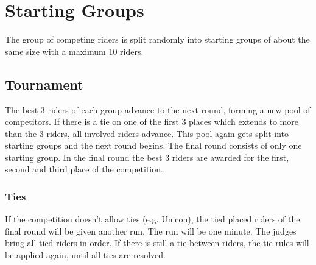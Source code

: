 \section{Starting Groups}
The group of competing riders is split randomly into starting groups of about the same size with a maximum 10 riders.

\subsection{Tournament}
The best 3 riders of each group advance to the next round, forming a new pool of competitors.
If there is a tie on one of the first 3 places which extends to more than the 3 riders, all involved riders advance.
This pool again gets split into starting groups and the next round begins.
The final round consists of only one starting group.
In the final round the best 3 riders are awarded for the first, second and third place of the competition.

\subsubsection{Ties}
If the competition doesn't allow ties (e.g. Unicon), the tied placed riders of the final round will be given another run.
The run will be one minute.
The judges bring all tied riders in order.
If there is still a tie between riders, the tie rules will be applied again, until all ties are resolved.

